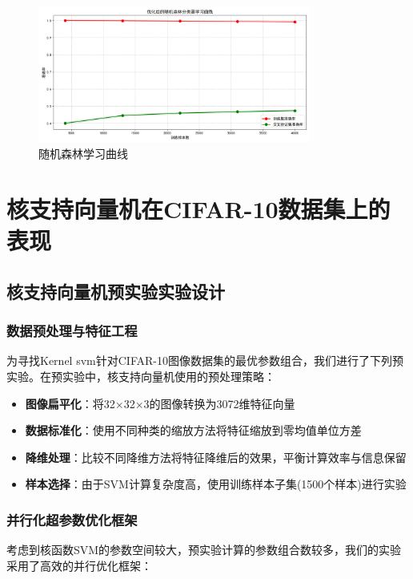 \documentclass[UTF8]{report}
\theoremstyle{MyLineTheoremStyle} %
\theoremstyle{MyBlockTheoremStyle} %
\theoremstyle{MySubsubsectionStyle} %
\begin{document}
\begin{figure}[H]
    \centering
    \includegraphics[width=0.8\textwidth]{rf_lc.png}
    \caption{随机森林学习曲线}
    \label{fig:rf_learning_curve}
\end{figure}





\section{核支持向量机在CIFAR-10数据集上的表现}

\subsection{核支持向量机预实验实验设计}

\subsubsection{数据预处理与特征工程}
为寻找Kernel svm针对CIFAR-10图像数据集的最优参数组合，我们进行了下列预实验。在预实验中，核支持向量机使用的预处理策略：

\begin{itemize}
    \item \textbf{图像扁平化}：将32×32×3的图像转换为3072维特征向量
    \item \textbf{数据标准化}：使用不同种类的缩放方法将特征缩放到零均值单位方差
    \item \textbf{降维处理}：比较不同降维方法将特征降维后的效果，平衡计算效率与信息保留
    \item \textbf{样本选择}：由于SVM计算复杂度高，使用训练样本子集(1500个样本)进行实验
\end{itemize}

\subsubsection{并行化超参数优化框架}
考虑到核函数SVM的参数空间较大，预实验计算的参数组合数较多，我们的实验采用了高效的并行优化框架：
\end{document}
